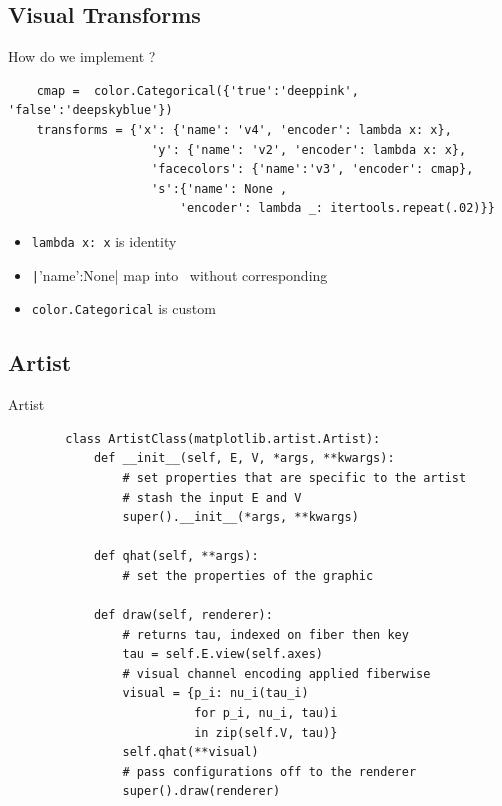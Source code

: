 \documentclass[xcolor={dvipsnames}, handout]{beamer}
\begin{document}
\subsection{Visual Transforms}
\begin{frame}[fragile]{How do we implement \vchannel?}
    \begin{verbatim}
    cmap =  color.Categorical({'true':'deeppink', 'false':'deepskyblue'})
    transforms = {'x': {'name': 'v4', 'encoder': lambda x: x},
                    'y': {'name': 'v2', 'encoder': lambda x: x},
                    'facecolors': {'name':'v3', 'encoder': cmap}, 
                    's':{'name': None , 
                        'encoder': lambda _: itertools.repeat(.02)}}
    \end{verbatim}
    \begin{itemize}
        \item \texttt{lambda x: x} is identity \vchannel\
        \item \texttt|{'name':None}| map into \vfiber\ without corresponding \dsection\
        \item \texttt{color.Categorical} is custom \vchannel
    \end{itemize}
\end{frame}
    

\subsection{Artist}
\begin{frame}[fragile]{Artist} %
    \begin{verbatim}
        class ArtistClass(matplotlib.artist.Artist):
            def __init__(self, E, V, *args, **kwargs):
                # set properties that are specific to the artist
                # stash the input E and V
                super().__init__(*args, **kwargs)
        
            def qhat(self, **args):
                # set the properties of the graphic
        
            def draw(self, renderer):
                # returns tau, indexed on fiber then key 
                tau = self.E.view(self.axes) 
                # visual channel encoding applied fiberwise 
                visual = {p_i: nu_i(tau_i)
                          for p_i, nu_i, tau)i 
                          in zip(self.V, tau)}
                self.qhat(**visual)
                # pass configurations off to the renderer
                super().draw(renderer)
        \end{verbatim}
\end{frame}
\end{document}
